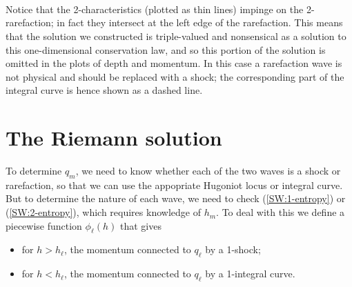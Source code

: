 \documentclass{SIAMbook2016}
\providecommand{\tightlist}{%
      \setlength{\itemsep}{0pt}\setlength{\parskip}{0pt}}
\begin{document}
    \begin{center}
    \end{center}
    { \hspace*{\fill} \\}
    
    \begin{center}
    \end{center}
    { \hspace*{\fill} \\}
    
    \begin{center}
    \end{center}
    { \hspace*{\fill} \\}
    
Notice that the 2-characteristics (plotted as thin lines) impinge on the
2-rarefaction; in fact they intersect at the left edge of the
rarefaction. This means that the solution we constructed is
triple-valued and nonsensical as a solution to this one-dimensional
conservation law, and so this portion of the solution is omitted in the
plots of depth and momentum. In this case a rarefaction wave is not
physical and should be replaced with a shock; the corresponding part of
the integral curve is hence shown as a dashed line.

\hypertarget{the-riemann-solution}{%
\section{The Riemann solution}\label{the-riemann-solution}}

To determine \(q_m\), we need to know whether each of the two waves is a
shock or rarefaction, so that we can use the appopriate Hugoniot locus
or integral curve. But to determine the nature of each wave, we need to
check (\ref{SW:1-entropy}) or (\ref{SW:2-entropy}), which requires
knowledge of \(h_m\). To deal with this we define a piecewise function
\(\phi_\ell(h)\) that gives

\begin{itemize}
\tightlist
\item
  for \(h>h_\ell\), the momentum connected to \(q_\ell\) by a 1-shock;
\item
  for \(h<h_\ell\), the momentum connected to \(q_\ell\) by a 1-integral
  curve.
\end{itemize}
\end{document}
